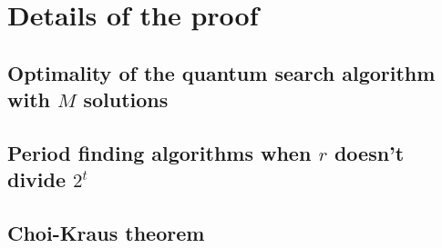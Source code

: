 \chapter{Details of the proof}
\section{Optimality of the quantum search algorithm with $M$ solutions}

\section{Period finding algorithms when $r$ doesn't divide $2^t$}

\section{Choi-Kraus theorem}





